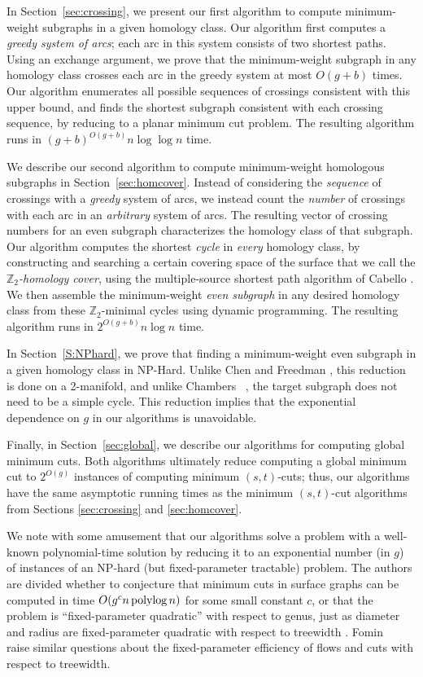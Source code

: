 \documentclass[11pt,twoside]{article}
\def\Z{\mathbb{Z}}
\begin{document}
In Section~\ref{sec:crossing}, we present our first algorithm to compute minimum-weight subgraphs in a given homology class.  Our algorithm first computes a \emph{greedy system of arcs}; each arc in this system consists of two shortest paths.  Using an exchange argument, we prove that the minimum-weight subgraph in any homology class crosses each arc in the greedy system at most $O(g+b)$ times.  Our algorithm enumerates all possible sequences of crossings consistent with this upper bound, and finds the shortest subgraph consistent with each crossing sequence, by reducing to a planar minimum cut problem.  The resulting algorithm runs  in $(g+b)^{O(g+b)}n\log \log n$ time.

We describe our second algorithm to compute minimum-weight homologous subgraphs in Section~\ref{sec:homcover}.  Instead of considering the \emph{sequence} of crossings with a \emph{greedy} system of arcs, we instead count the \emph{number} of crossings with each arc in an \emph{arbitrary} system of arcs.  The resulting vector of crossing numbers for an even subgraph characterizes the homology class of that subgraph.  Our algorithm computes the shortest \emph{cycle} in \emph{every} homology class, by constructing and searching a certain covering space of the surface  that we call the \emph{$\Z_2$-homology cover}, using the multiple-source shortest path algorithm of Cabello \etal \cite{cce-msspe-13}.  We then assemble the minimum-weight \emph{even subgraph} in any desired homology class from these $\Z_2$-minimal cycles using dynamic programming.  The resulting algorithm runs in $2^{O(g+b)}n\log n$ time.

In Section~\ref{S:NPhard}, we prove that finding a minimum-weight even subgraph in a given homology class in NP-Hard.  
Unlike Chen and Freedman \cite{cf-hrhl-10}, this reduction is done on a 2-manifold, and unlike Chambers \etal~\cite{ccelw-scsih-08}, the target subgraph does not need to be a simple cycle.
This reduction implies that the exponential dependence on $g$ in our algorithms is unavoidable.  

Finally, in Section~\ref{sec:global}, we describe our algorithms for computing global minimum cuts.  Both algorithms ultimately reduce computing a global minimum cut to  $2^{O(g)}$ instances of computing minimum $(s,t)$-cuts; thus, our algorithms have the same asymptotic running times as the minimum $(s,t)$-cut algorithms from Sections \ref{sec:crossing} and \ref{sec:homcover}.

We note with some amusement that our algorithms solve a problem with a well-known polynomial-time solution by reducing it to an exponential number (in $g$) of instances of an NP-hard (but fixed-parameter tractable) problem.  
The authors are divided whether to conjecture that minimum cuts in surface graphs can  be computed in time $O(g^c n\operatorname{polylog} n)$ for some small constant $c$, or that the problem is “fixed-parameter quadratic” with respect to genus, just as diameter and radius are fixed-parameter quadratic with respect to treewidth \cite{aww-afpsa-16}.  Fomin \etal~\cite{flspw-fppcg-18} raise similar questions about the fixed-parameter efficiency of flows and cuts with respect to treewidth.
\end{document}
